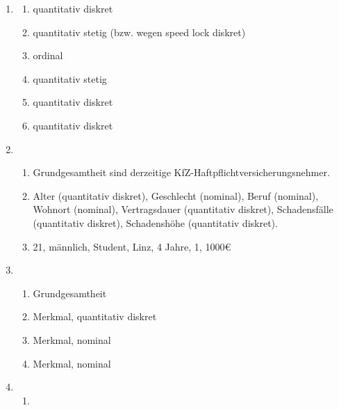 \documentclass{article}
\begin{document}
\begin{enumerate}
    \item \begin{multicols}{2}
        \begin{enumerate}
            \item quantitativ diskret
            \item quantitativ stetig (bzw. wegen speed lock diskret)
            \item ordinal
            \item quantitativ stetig
            \item quantitativ diskret
            \item quantitativ diskret
        \end{enumerate}
    \end{multicols}

    \item \begin{enumerate}
        \item Grundgesamtheit sind derzeitige KfZ-Haftpflichtversicherungsnehmer.
        \item Alter (quantitativ diskret), Geschlecht (nominal), Beruf (nominal), Wohnort (nominal), Vertragsdauer (quantitativ diskret), Schadensfälle (quantitativ diskret), Schadenshöhe (quantitativ diskret).
        \item 21, männlich, Student, Linz, 4 Jahre, 1, 1000€
    \end{enumerate}

    \item \begin{enumerate}
        \item Grundgesamtheit
        \item Merkmal, quantitativ diskret
        \item Merkmal, nominal
        \item Merkmal, nominal
    \end{enumerate}

    \item \begin{enumerate}
        \item 
    \end{enumerate}
\end{enumerate}
\end{document}

